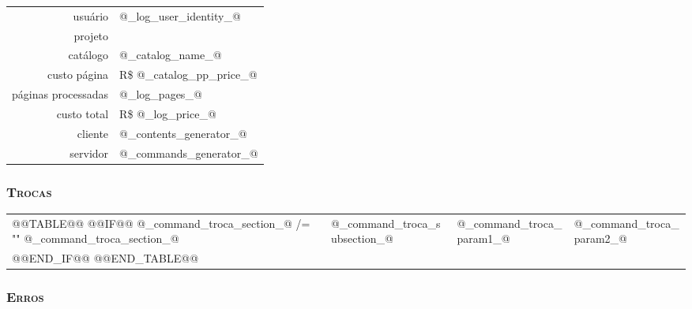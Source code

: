 \documentclass{article}
\newcommand\money[1]{R\$ #1}		%
\begin{document}

		\begin{center}
			\begin{xtabular}{rp{.6\textwidth}}
				usuário			& @_log_user_identity_@ \\
				projeto			& \projectname \\
				catálogo		& @_catalog_name_@ \\
				custo página		& \money{@_catalog_pp_price_@} \\
				páginas processadas	& @_log_pages_@ \\
				custo total		& \money{@_log_price_@} \\
				cliente			& @_contents_generator_@ \\
				servidor		& @_commands_generator_@ 
			\end{xtabular}
		\end{center}


		\subsubsection{\textsc{Trocas}}
		
		
			\begin{center}
				\begin{xtabular}{l | l | p{.3\textwidth} | p{.3\textwidth}}
					@@TABLE@@
						@@IF@@ @_command_troca_section_@ /= ""
							@_command_troca_section_@	& 
							@_command_troca_subsection_@	& 
							@_command_troca_param1_@	& 
							@_command_troca_param2_@ \\
						@@END_IF@@
					@@END_TABLE@@
				\end{xtabular}
			\end{center}

	
		\subsubsection{\textsc{Erros}}
		
		
\end{document}
